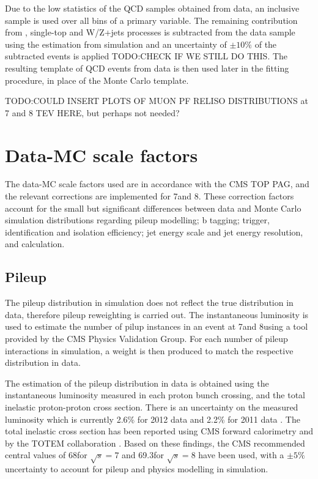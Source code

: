 Due to the low statistics of the QCD samples obtained from data, an inclusive sample is used over all bins of
a primary variable. The remaining contribution from \ttbar, single-top and W/Z+jets processes is subtracted
from the data sample using the estimation from simulation and an uncertainty of $\pm10\%$ of the subtracted
events is applied TODO:CHECK IF WE STILL DO THIS. %
The resulting template of QCD events from data is then used later in the fitting procedure, in place of the
Monte Carlo template.

TODO:COULD INSERT PLOTS OF MUON PF RELISO DISTRIBUTIONS at 7 and 8 TEV HERE, but perhaps not needed?


\section{Data-MC scale factors}
\label{s:data_mc_scale_factors}
The data-MC scale factors used are in accordance with the CMS TOP PAG, and the relevant corrections are
implemented for 7\TeV and 8\TeV. These correction factors account for the small but significant differences
between data and Monte Carlo simulation distributions regarding pileup modelling; b tagging; trigger,
identification and isolation efficiency; jet energy scale and jet energy resolution, and \met calculation.

\subsection{Pileup}
\label{ss:pileup}
The pileup distribution in simulation does not reflect the true distribution in data, therefore pileup
reweighting is carried out. The instantaneous luminosity is used to estimate the number of pilup instances in
an event at 7\TeV and 8\TeV using a tool provided by the CMS Physics Validation Group. For each number of
pileup interactions in simulation, a weight is then produced to match the respective distribution in data.

The estimation of the pileup distribution in data is obtained using the instantaneous luminosity measured in
each proton bunch crossing, and the total inelastic proton-proton cross section. There is an uncertainty on
the measured luminosity which is currently 2.6\% for 2012 data \cite{CMS:2013gfa} and 2.2\% for 2011 data
\cite{CMS:2012eui}. The total inelastic cross section has been reported using CMS forward calorimetry
\cite{Chatrchyan:2012gwa} and by the TOTEM collaboration \cite{Antchev:2011vs}. Based on these findings, the
CMS recommended central values of 68\mb for $\sqrt{s}=7$ and 69.3\mb for $\sqrt{s}=8$ have been used, with a
$\pm5\%$ uncertainty to account for pileup and physics modelling in simulation.

